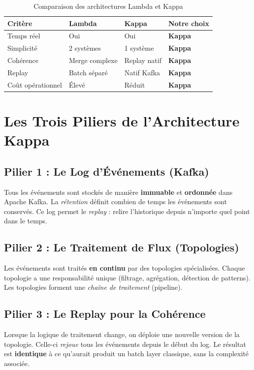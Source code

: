 \begin{table}[H]
\centering
\begin{tabularx}{\textwidth}{L{3.5cm} C{3.5cm} C{3.5cm} C{3cm}}
\toprule
\textbf{\color{primarycolor}Critère} &
\textbf{\color{primarycolor}Lambda} &
\textbf{\color{primarycolor}Kappa} &
\textbf{\color{primarycolor}Notre choix} \\
\midrule
Temps réel & Oui & Oui & \textbf{Kappa} \\
\addlinespace[0.1cm]
Simplicité & 2 systèmes & 1 système & \textbf{Kappa} \\
\addlinespace[0.1cm]
Cohérence & Merge complexe & Replay natif & \textbf{Kappa} \\
\addlinespace[0.1cm]
Replay & Batch séparé & Natif Kafka & \textbf{Kappa} \\
\addlinespace[0.1cm]
Coût opérationnel & Élevé & Réduit & \textbf{Kappa} \\
\bottomrule
\end{tabularx}
\caption{Comparaison des architectures Lambda et Kappa}
\end{table}

\section{Les Trois Piliers de l'Architecture Kappa}

\subsection{Pilier 1 : Le Log d'Événements (Kafka)}
Tous les événements sont stockés de manière \textbf{immuable} et \textbf{ordonnée} dans Apache Kafka. La \textit{rétention} définit combien de temps les événements sont conservés. Ce log permet le \textit{replay} : relire l'historique depuis n'importe quel point dans le temps.

\subsection{Pilier 2 : Le Traitement de Flux (Topologies)}
Les événements sont traités \textbf{en continu} par des topologies spécialisées. Chaque topologie a une responsabilité unique (filtrage, agrégation, détection de patterns). Les topologies forment une \textit{chaîne de traitement} (pipeline).

\subsection{Pilier 3 : Le Replay pour la Cohérence}
Lorsque la logique de traitement change, on déploie une nouvelle version de la topologie. Celle-ci \textit{rejoue} tous les événements depuis le début du log. Le résultat est \textbf{identique} à ce qu'aurait produit un batch layer classique, sans la complexité associée.

